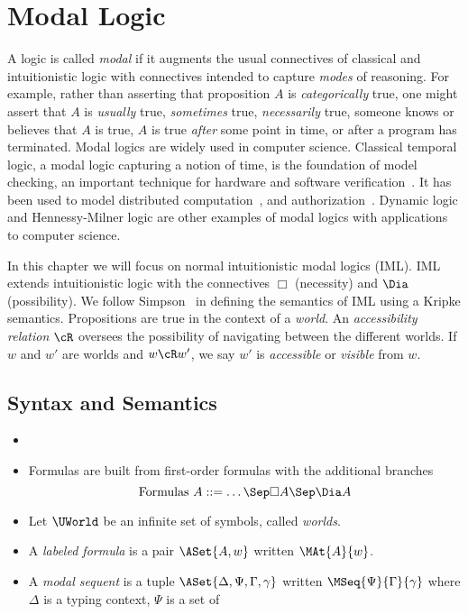 
\chapter{Modal Logic}\label{chapter.modal}


A logic is called \emph{modal} if it augments the usual connectives
of classical and intuitionistic logic with connectives intended to capture
\emph{modes} of reasoning.  For example, rather than asserting that proposition
$A$ is \emph{categorically} true, one might assert that $A$ is \emph{usually}
true, \emph{sometimes} true, \emph{necessarily} true,
someone knows or believes that $A$ is true, $A$ is true \emph{after} some
point in time, or after a program has terminated.
Modal logics are widely used in computer science.  Classical
temporal logic, a modal logic capturing a notion of time, is the foundation of
model checking, an important technique for hardware and software
verification~\cite{Clarke.2001.Handbook}.  It has been used to model distributed
computation~\cite{Murphy.2004.LICS}, and
authorization~\cite{Gurevich.2009.DKAL2,Gurevich.2008.DKAL,Garg.2009.Thesis}.
Dynamic logic and Hennessy-Milner logic are other examples of modal logics with
applications to computer science.

In this chapter we will focus on normal intuitionistic modal logics (IML).  IML
extends intuitionistic logic with the connectives $\Box$ (necessity) and $\Dia$
(possibility).  We follow Simpson~\cite{Simpson.1994.Thesis} in defining the
semantics of IML using a Kripke semantics.  Propositions are true in the
context of a \emph{world}.  An \emph{accessibility relation} $\cR$ oversees the
possibility of navigating between the different worlds.  If $w$ and $w'$ are
worlds and $w\cR w'$, we say $w'$ is \emph{accessible} or \emph{visible} from
$w$.

\section{Syntax and Semantics}
\label{modal.sec.def}

\begin{definition}
  \begin{itemize}
  \item[]
  \item Formulas are built from first-order formulas with the additional
    branches
    \[
    \mbox{Formulas } A ::= \ldots \Sep \Box A \Sep \Dia A
    \]
  \item Let $\UWorld$ be an infinite set of symbols, called \emph{worlds}.
  \item A \emph{labeled formula} is a pair $\ASet{A,w}$ written $\MAt{A}{w}$.
  \item A \emph{modal sequent} is a tuple $\ASet{\Delta,\Psi,\Gamma,\gamma}$
    written $\MSeq{\Psi}{\Gamma}{\gamma}$ where $\Delta$ is a typing context,
    $\Psi$ is a set of

  \end{itemize}
\end{definition}

